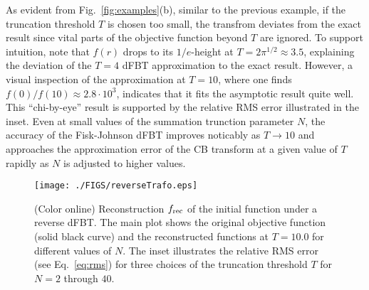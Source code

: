 \documentclass[12pt]{iopart}
\begin{document}
As evident from Fig.~\ref{fig:examples}(b), similar to the previous example, if
the truncation threshold $T$ is chosen too small, the transfrom deviates from
the exact result since vital parts of the objective function beyond $T$ are
ignored. To support intuition, note that $f(r)$ drops to its $1/e$-height at
$T=2 \pi^{1/2}\approx 3.5$, explaining the deviation of the $T=4$ dFBT
approximation to the exact result.
However, a visual inspection of the approximation at $T=10$, where one finds 
\mbox{$f(0)/f(10)\approx 2.8\cdot 10^3$}, indicates that it fits the asymptotic
result quite well. This ``chi-by-eye'' result is supported by the relative RMS
error illustrated in the inset. Even at small values of the summation trunction
parameter $N$, the accuracy of the Fisk-Johnson dFBT improves noticably as
$T\to 10$ and approaches the approximation error of the CB transform at a given
value of $T$ rapidly as $N$ is adjusted to higher values. 

%
%
\begin{figure}[t!]
\centerline{\texttt{[image: ./FIGS/reverseTrafo.eps]} } 
\caption{(Color online) Reconstruction $f_{\rm rec}$ of the initial function
under a reverse dFBT. The main plot shows the original objective function
(solid black curve) and the reconstructed functions at $T=10.0$ for different
values of $N$. The inset illustrates the relative RMS error (see
Eq.~\ref{eq:rms}) for three choices of the truncation threshold $T$ for $N=2$
through $40$.}
\label{fig:reverseTrafo}
\end{figure}
\end{document}
